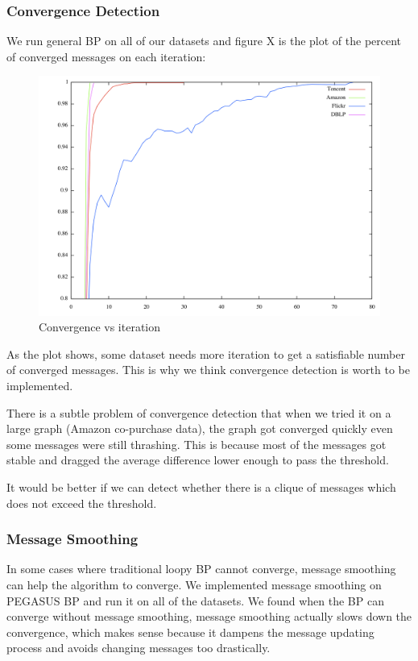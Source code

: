 \subsubsection{Convergence Detection}
We run general BP on all of our datasets and figure X is the plot of the percent of converged messages on each iteration:
\begin{figure}[!ht]
\centering
\begin{minipage}[b]{0.5\linewidth}
\centering
\includegraphics[width=\textwidth]{FIG/Converge.png}
\caption{Convergence vs iteration}
\end{minipage}
\end{figure}	

As the plot shows, some dataset needs more iteration to get a satisfiable number of converged messages. This is why we think convergence detection is worth to be implemented.

There is a subtle problem of convergence detection that when we tried it on a large graph (Amazon co-purchase data), the graph got converged quickly even some messages were still thrashing. This is because most of the messages got stable and dragged the average difference lower enough to pass the threshold.

It would be better if we can detect whether there is a clique of messages which does not exceed the threshold.

\subsubsection{Message Smoothing}
In some cases where traditional loopy BP cannot converge, message smoothing can help the algorithm to converge. We implemented message smoothing on PEGASUS BP and run it on all of the datasets. We found when the BP can converge without message smoothing, message smoothing actually slows down the convergence, which makes sense because it dampens the message updating process and avoids changing messages too drastically. 

